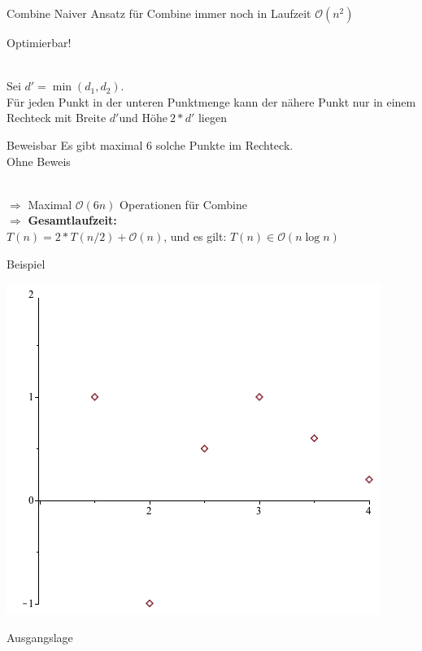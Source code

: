\documentclass[18pt]{beamer}
\begin{document}
		\begin{frame}{Combine}
			Naiver Ansatz für Combine immer noch in Laufzeit $\mathcal{O}(n^2)$ \\
			\centerline{\huge{Optimierbar!}} \\
			Sei $d' = \min(d_1, d_2)$. \\  
			Für jeden Punkt in der unteren Punktmenge kann der nähere Punkt nur in einem Rechteck mit Breite $d' \text{und Höhe} \ 2 * d'$ liegen
			\begin{block}{Beweisbar}
				Es gibt maximal 6 solche Punkte im Rechteck. \\
				Ohne Beweis
			\end{block}
			\ \\
			$\Rightarrow$ Maximal $\mathcal{O}(6n)$ Operationen für Combine \\
			$\Rightarrow$ \textbf{Gesamtlaufzeit:} \\ $T(n) = 2 * T(n/2) + \mathcal{O}(n)$, und es gilt: $T(n) \in \mathcal{O}(n \log n)$
		\end{frame}

		\begin{frame}{Beispiel}
			\begin{minipage}{0.45\textwidth}
				\includegraphics[width =\textwidth]{logos/PlotsBetter.png}
			\end{minipage}
			\begin{minipage}{0.45\textwidth}
				Ausgangslage		
			\end{minipage}
		\end{frame}
\end{document}
